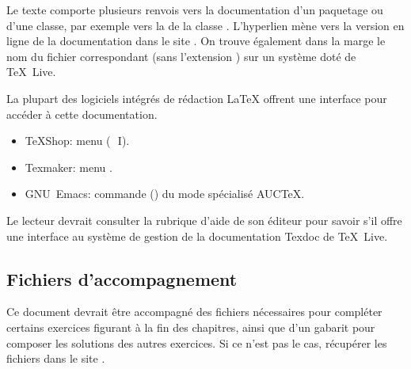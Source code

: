 Le texte comporte plusieurs renvois vers la documentation d'un
paquetage ou d'une classe, par exemple vers la %
de la classe . L'hyperlien mène vers la version en ligne
de la documentation dans le site %
. On trouve également dans la
marge le nom du fichier correspondant (sans l'extension )
sur un système doté de {\TeX}~Live.

La plupart des logiciels intégrés de rédaction {\LaTeX} offrent une
interface pour accéder à cette documentation.
\begin{itemize}
\item TeXShop: menu  (\optkey\,\cmdkey\, I).
\item Texmaker: menu .
\item GNU~Emacs: commande  () du mode
  spécialisé AUC{\TeX}.
\end{itemize}
Le lecteur devrait consulter la rubrique d'aide de son éditeur pour
savoir s'il offre une interface au système de gestion de la
documentation Texdoc de {\TeX}~Live.

\subsection*{Fichiers d'accompagnement}

Ce document devrait être accompagné des fichiers nécessaires pour
compléter certains exercices figurant à la fin des chapitres, ainsi
que d'un gabarit  pour composer les
solutions des autres exercices. Si ce n'est pas le cas, récupérer les
fichiers dans le site .

